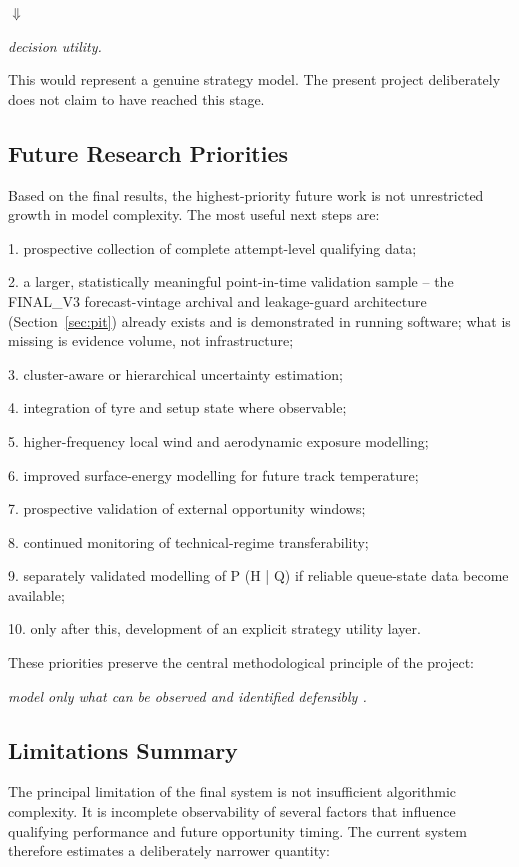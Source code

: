 \begin{center}\textit{\ensuremath{\Downarrow}}\end{center}

\begin{center}\textit{decision utility.}\end{center}

This would represent a genuine strategy model. The present project deliberately does not claim to have reached this stage.

\subsection{Future Research Priorities}
Based on the final results, the highest-priority future work is not unrestricted growth in model complexity. The most useful next steps are:

1. prospective collection of complete attempt-level qualifying data;

2. a larger, statistically meaningful point-in-time validation sample -- the FINAL\_V3 forecast-vintage archival and leakage-guard architecture (Section~\ref{sec:pit}) already exists and is demonstrated in running software; what is missing is evidence volume, not infrastructure;

3. cluster-aware or hierarchical uncertainty estimation;

4. integration of tyre and setup state where observable;

5. higher-frequency local wind and aerodynamic exposure modelling;

6. improved surface-energy modelling for future track temperature;

7. prospective validation of external opportunity windows;

8. continued monitoring of technical-regime transferability;

9. separately validated modelling of P (H | Q) if reliable queue-state data become available;

10. only after this, development of an explicit strategy utility layer.

These priorities preserve the central methodological principle of the project:

\begin{center}\textit{model only what can be observed and identified defensibly .}\end{center}

\subsection{Limitations Summary}
The principal limitation of the final system is not insufficient algorithmic complexity. It is incomplete observability of several factors that influence qualifying performance and future opportunity timing. The current system therefore estimates a deliberately narrower quantity:

